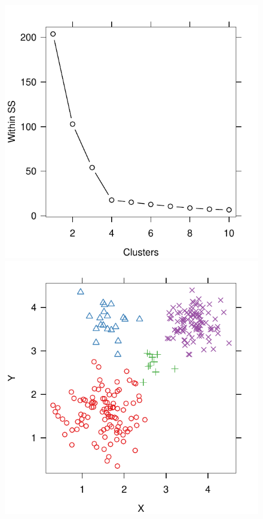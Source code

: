 \documentclass[12pt]{article}
\begin{document}
\begin{figure}
\begin{minipage}{\linewidth}
\begin{minipage}{0.45\linewidth}
    \includegraphics[width=\linewidth]{demo/elbow/correct-withinss.pdf}
  \end{minipage}
\end{minipage}
\begin{minipage}{\linewidth}
  \begin{minipage}{0.45\linewidth}
    \includegraphics[width=\linewidth]{demo/elbow/incorrect-data.pdf}

\end{minipage}
\end{minipage}
\end{figure}
\end{document}
